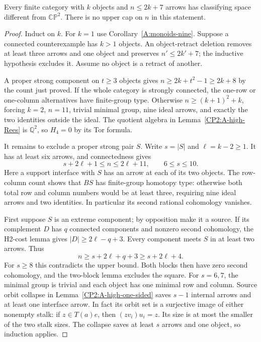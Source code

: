 \begin{theorem}
\label{CP2:A-high-all-eight}
Every finite category with $k$ objects and $n\leq2k+7$
arrows has classifying space different from
$\mathbb{CP}^2$.  There is no upper cap on $n$ in this statement.
\end{theorem}
\begin{proof}
Induct on $k$.  For $k=1$ use Corollary~\ref{A:monoids-nine}.
Suppose a connected counterexample has $k>1$ objects.
An object-retract deletion removes at least three
arrows and one object and preserves $n'\leq2k'+7$;
the inductive hypothesis excludes it.  Assume no
object is a retract of another.

A proper strong component on $t\geq3$ objects gives
$n\geq2k+t^2-1\geq2k+8$ by the count just proved.
If the whole category is strongly connected, the
one-row or one-column alternatives have finite-group
type.  Otherwise $n\geq(k+1)^2+k$, forcing $k=2$,
$n=11$, trivial minimal group, nine ideal arrows,
and exactly the two identities outside the ideal.
The quotient algebra in Lemma~\ref{CP2:A-high-Rees}
is $\mathbb Q^2$, so $H_4=0$ by its Tor formula.

It remains to exclude a proper strong pair $S$.
Write $s=|S|$ and $\ell=k-2\geq1$.
It has at least six arrows, and connectedness gives
\[
 s+2\ell+1\leq n\leq2\ell+11,
 \qquad 6\leq s\leq10.
\]
Here a support interface with $S$ has an arrow at each
of its two objects.  The row-column count shows that
$BS$ has finite-group homotopy type: otherwise both
total row and column numbers would be at least three,
requiring nine ideal arrows and two identities.
In particular its second rational cohomology vanishes.

First suppose $S$ is an extreme component; by opposition
make it a source.  If its complement $D$ has $q$ connected
components and nonzero second cohomology, the H2-cost
lemma gives
$|D|\geq2\ell-q+3$.  Every component meets $S$ in
at least two arrows.  Thus
\[
 n\geq s+2\ell+q+3\geq s+2\ell+4.
\]
For $s\geq8$ this contradicts the upper bound.  Both
blocks then have zero second cohomology, and the
two-block lemma excludes the square.  For $s=6,7$,
the minimal group is trivial and each object has one
minimal row and column.  Source orbit collapse in
Lemma~\ref{CP2:A-high-one-sided} saves $s-1$ internal
arrows and at least one interface arrow.  In fact its
orbit set is a surjective image of either nonempty
stalk: if $z\in T(a)e$, then
$(zv_i)u_i=z$.  Its size is at most the smaller of the
two stalk sizes.  The collapse saves at least $s$
arrows and one object, so induction applies.


\end{proof}
